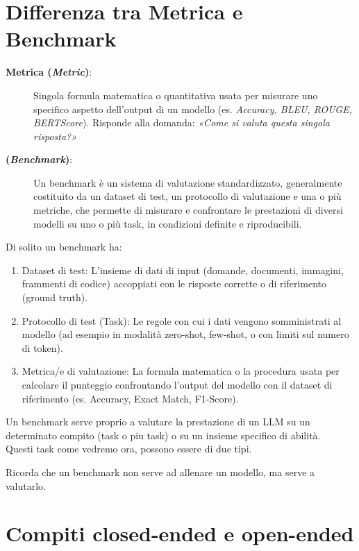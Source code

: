 \section*{Differenza tra Metrica e Benchmark}

\begin{description}
    \item[\textbf{Metrica (\textit{Metric})}:] Singola formula matematica o quantitativa usata per misurare uno specifico aspetto dell'output di un modello (es. \textit{Accuracy, BLEU, ROUGE, BERTScore}). Risponde alla domanda: \textit{«Come si valuta questa singola risposta?»}
    \item[\textbf{(\textit{Benchmark})}:] Un benchmark è un sistema di valutazione standardizzato, generalmente costituito da un dataset di test, un protocollo di valutazione e una o più metriche, che permette di misurare e confrontare le prestazioni di diversi modelli su uno o più task, in condizioni definite e riproducibili.
\end{description}

Di solito un benchmark ha:
\begin{enumerate}
    \item Dataset di test: L'insieme di dati di input (domande, documenti, immagini, frammenti di codice) accoppiati con le risposte corrette o di riferimento (ground truth).
    \item Protocollo di test (Task): Le regole con cui i dati vengono somministrati al modello (ad esempio in modalità zero-shot, few-shot, o con limiti sul numero di token).
    \item Metrica/e di valutazione: La formula matematica o la procedura usata per calcolare il punteggio confrontando l'output del modello con il dataset di riferimento (es. Accuracy, Exact Match, F1-Score).
\end{enumerate}
\begin{center}
Un benchmark serve proprio a valutare la prestazione di un LLM su un determinato compito (task o piu task) o su un insieme specifico di abilità. \\
Questi task come vedremo ora, possono essere di due tipi.    
\end{center}
Ricorda che un benchmark non serve ad allenare un modello, ma serve a valutarlo.

\section{Compiti closed-ended e open-ended}

